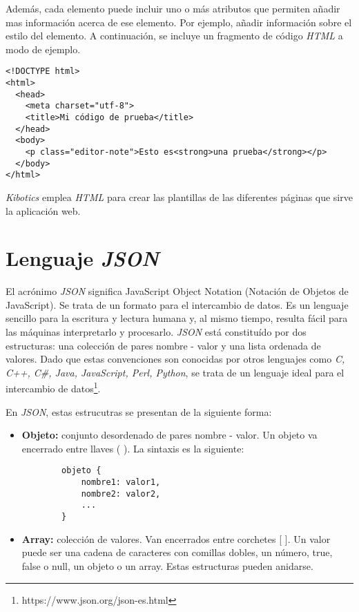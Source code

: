    


Además, cada elemento puede incluir uno o más atributos que permiten añadir mas información acerca de ese elemento. Por ejemplo, añadir información sobre el estilo del elemento. A continuación, se incluye un fragmento de código \textit{HTML} a modo de ejemplo. 
\begin{verbatim}
<!DOCTYPE html>
<html>
  <head>
    <meta charset="utf-8">
    <title>Mi código de prueba</title>
  </head>
  <body>
    <p class="editor-note">Esto es<strong>una prueba</strong></p>
  </body>
</html>
\end{verbatim}

\textit{Kibotics} emplea \textit{HTML} para crear las plantillas de las diferentes páginas que sirve la aplicación web.

\section{Lenguaje \textit{JSON}}
El acrónimo \textit{JSON} significa JavaScript Object Notation (Notación de Objetos de JavaScript). Se trata de un formato para el intercambio de datos. Es un lenguaje sencillo para la escritura y lectura humana y, al mismo tiempo, resulta fácil para las máquinas interpretarlo y procesarlo. \textit{JSON} está constituído por dos estructuras: una colección de pares nombre - valor y una lista ordenada de valores. Dado que estas convenciones son conocidas por otros lenguajes como  \textit{C, C++, C#, Java, JavaScript, Perl, Python}, se trata de un lenguaje ideal para el intercambio de datos\footnote{https://www.json.org/json-es.html}. \newline


En \textit{JSON}, estas estrucutras se presentan de la siguiente forma:
\begin{itemize}
    \item \textbf{Objeto: } conjunto desordenado de pares nombre - valor. Un objeto va encerrado entre llaves ({ }). La sintaxis es la siguiente: 
    \begin{verbatim}
        objeto {
            nombre1: valor1,
            nombre2: valor2,
            ...
        }
    \end{verbatim}
    \item \textbf{Array: } colección de valores. Van encerrados entre corchetes [ ]. Un valor puede ser una cadena de caracteres con comillas dobles, un número, true, false o null, un objeto o un array. Estas estructuras pueden anidarse.

\end{itemize}

